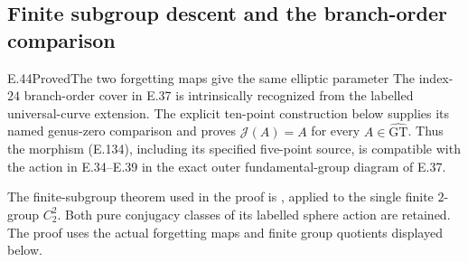 \subsection{Finite subgroup descent and the branch-order comparison}

\begin{result}{E.44}{Proved}{The two forgetting maps give the same elliptic parameter}
The index-$24$ branch-order cover in E.37 is intrinsically recognized
from the labelled universal-curve extension.  The explicit
ten-point construction below supplies its named genus-zero comparison
and proves $\mathcal J(A)=A$ for every
$A\in\widehat{\mathrm{GT}}$.
Thus the morphism (E.134), including its specified five-point source,
is compatible with the action in E.34--E.39 in the exact outer
fundamental-group diagram of E.37.

The finite-subgroup theorem used in the proof is
\cite[Theorem A]{ET_BZ2024}, applied to the single finite $2$-group
$C_2^2$.  Both pure conjugacy classes of its labelled sphere action
are retained.  The proof uses the actual forgetting maps and
finite group quotients displayed below.
\end{result}
